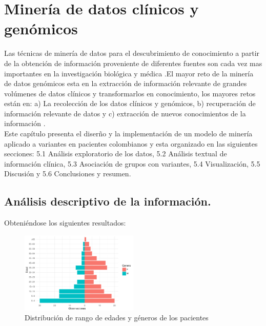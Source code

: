 \chapter{Minería de datos clínicos y genómicos}

Las técnicas de minería de datos para el descubrimiento de conocimiento a partir de la obtención de información proveniente de diferentes fuentes son cada vez mas importantes en la investigación biológica y médica \cite{Wang2017}.El mayor reto de la minería de datos genómicos esta en la extracción de información relevante de grandes volúmenes de datos clínicos y transformarlos en conocimiento, los mayores retos están en: a) La recolección de los datos clínicos y genómicos, b) recuperación de información relevante de datos y c) extracción de nuevos conocimientos de la información \cite{Farid2016}. \\  


Este capítulo presenta el diserño y la implementación de un modelo de minería aplicado a variantes en pacientes colombianos y esta organizado en las siguientes secciones: 5.1 Análisis exploratorio de los datos, 5.2 Análisis textual de información clínica, 5.3 Asociación de grupos con variantes, 5.4 Visualización, 5.5 Discusión y 5.6 Conclusiones y resumen. 

\section{Análisis descriptivo de la información.}

Obteniéndose los siguientes resultados:

\begin{figure}[h!]
	\centering
	\includegraphics[width=0.5\textwidth]{Kap4/general}
	\caption{Distribución de rango de edades y géneros de los pacientes}
	\label{fig:general}
\end{figure}

